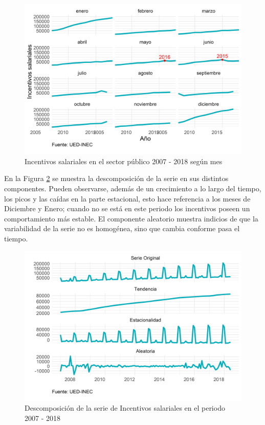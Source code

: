\documentclass[
]{article}
\begin{document}
\begin{figure}[H]
\includegraphics[width=1\linewidth,height=1\textheight]{Tesis_files/figure-latex/incentivosplotperiodos-1} \caption{Incentivos salariales en el sector público 2007 - 2018 según mes}\label{fig:incentivosplotperiodos}
\end{figure}

En la Figura \ref{fig:incentivosplotdescomposicion} se muestra la
descomposición de la serie en sus distintos componentes. Pueden
observarse, además de un crecimiento a lo largo del tiempo, los picos y
las caídas en la parte estacional, esto hace referencia a los meses de
Diciembre y Enero; cuando no se está en este periodo los incentivos
poseen un comportamiento más estable. El componente aleatorio muestra
indicios de que la variabilidad de la serie no es homogénea, sino que
cambia conforme pasa el tiempo.

\begin{figure}[H]
\includegraphics[width=1\linewidth,height=1\textheight]{Tesis_files/figure-latex/incentivosplotdescomposicion-1} \caption{Descomposición de la serie de Incentivos salariales en el periodo 2007 - 2018}\label{fig:incentivosplotdescomposicion}
\end{figure}
\end{document}
